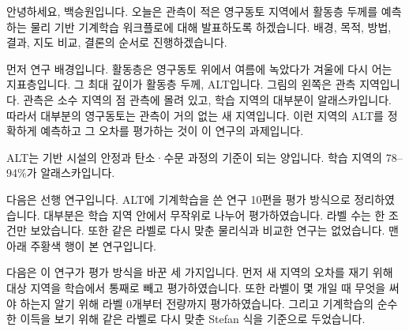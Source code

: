 

안녕하세요, 백승원입니다. 오늘은 관측이 적은 영구동토 지역에서 활동층 두께를 예측하는 물리 기반 기계학습 워크플로에 대해 발표하도록 하겠습니다. 배경, 목적, 방법, 결과, 지도 비교, 결론의 순서로 진행하겠습니다.



먼저 연구 배경입니다. 활동층은 영구동토 위에서 여름에 녹았다가 겨울에 다시 어는 지표층입니다. 그 최대 깊이가 활동층 두께, ALT입니다. 그림의 왼쪽은 관측 지역입니다. 관측은 소수 지역의 점 관측에 몰려 있고, 학습 지역의 대부분이 알래스카입니다. 따라서 대부분의 영구동토는 관측이 거의 없는 새 지역입니다. 이런 지역의 ALT를 정확하게 예측하고 그 오차를 평가하는 것이 이 연구의 과제입니다.


\begin{optbox}
ALT는 기반 시설의 안정과 탄소·수문 과정의 기준이 되는 양입니다. 학습 지역의 78–94\%가 알래스카입니다.
\end{optbox}


다음은 선행 연구입니다. ALT에 기계학습을 쓴 연구 10편을 평가 방식으로 정리하였습니다. 대부분은 학습 지역 안에서 무작위로 나누어 평가하였습니다. 라벨 수는 한 조건만 보았습니다. 또한 같은 라벨로 다시 맞춘 물리식과 비교한 연구는 없었습니다. 맨 아래 주황색 행이 본 연구입니다.



다음은 이 연구가 평가 방식을 바꾼 세 가지입니다. 먼저 새 지역의 오차를 재기 위해 대상 지역을 학습에서 통째로 빼고 평가하였습니다. 또한 라벨이 몇 개일 때 무엇을 써야 하는지 알기 위해 라벨 0개부터 전량까지 평가하였습니다. 그리고 기계학습의 순수한 이득을 보기 위해 같은 라벨로 다시 맞춘 Stefan 식을 기준으로 두었습니다.



